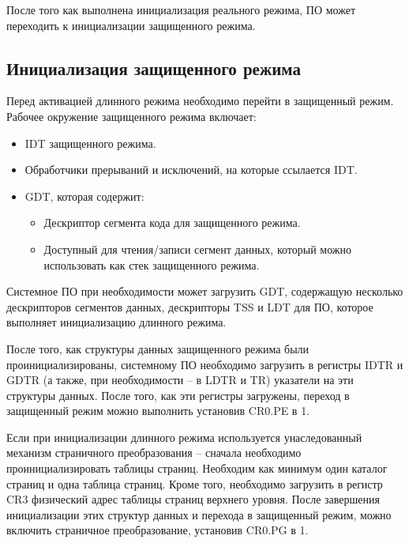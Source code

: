 После того как выполнена инициализация реального режима, ПО может переходить к
инициализации защищенного режима.

\subsection{Инициализация защищенного режима}
Перед активацией длинного режима необходимо перейти в защищенный режим.
Рабочее окружение защищенного режима включает:
\begin{itemize}
\item IDT защищенного режима.
\item Обработчики прерываний и исключений, на которые ссылается IDT.
\item GDT, которая содержит:
	\begin{itemize}
	\item Дескриптор сегмента кода для защищенного режима.
	\item Доступный для чтения/записи сегмент данных, который можно использовать как стек защищенного режима.
	\end{itemize}
\end{itemize}

Системное ПО при необходимости может загрузить GDT, содержащую несколько дескрипторов сегментов данных,
дескрипторы TSS и LDT для ПО, которое выполняет инициализацию длинного режима.

После того, как структуры данных защищенного режима были проинициализированы, системному ПО необходимо
загрузить в регистры IDTR и GDTR (а также, при необходимости -- в LDTR и TR) указатели на эти структуры данных.
После того, как эти регистры загружены, переход в защищенный режим можно выполнить установив CR0.PE в 1.

Если при инициализации длинного режима используется унаследованный механизм страничного преобразования --
сначала необходимо проинициализировать таблицы страниц. Необходим как минимум один каталог страниц и одна
таблица страниц. Кроме того, необходимо загрузить в регистр CR3 физический адрес таблицы страниц верхнего
уровня. После завершения инициализации этих структур данных и перехода в защищенный режим, можно
включить страничное преобразование, установив CR0.PG в 1.

